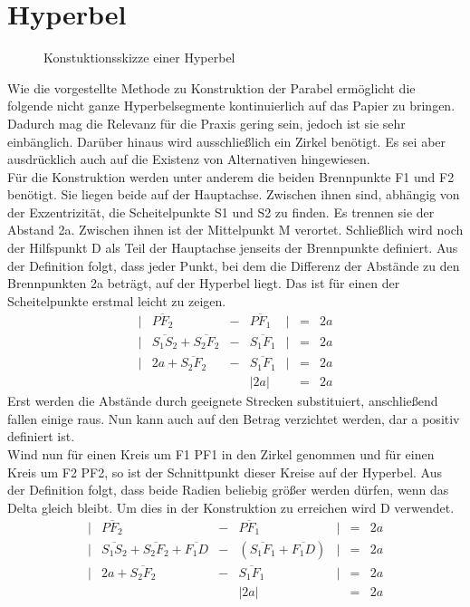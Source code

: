 \section{Hyperbel}
\begin{figure}[h]
	\centering
		\resizebox{.5\linewidth}{!}{
			
		}
	\caption{Konstuktionsskizze einer Hyperbel}
\end{figure}
Wie die vorgestellte Methode zu Konstruktion der Parabel ermöglicht die folgende nicht ganze Hyperbelsegmente kontinuierlich auf das Papier zu bringen. Dadurch mag die Relevanz für die Praxis gering sein, jedoch ist sie sehr einbänglich. Darüber hinaus wird ausschließlich ein Zirkel benötigt. Es sei aber ausdrücklich auch auf die Existenz von Alternativen hingewiesen.\\
Für die Konstruktion werden unter anderem die beiden Brennpunkte F1 und F2 benötigt. Sie liegen beide auf der Hauptachse. Zwischen ihnen sind, abhängig von der Exzentrizität, die Scheitelpunkte S1 und S2 zu finden. Es trennen sie der Abstand 2a. Zwischen ihnen ist der Mittelpunkt M verortet. Schließlich wird noch der Hilfspunkt D als Teil der Hauptachse jenseits der Brennpunkte definiert.
Aus der Definition folgt, dass jeder Punkt, bei dem die Differenz der Abstände zu den Brennpunkten 2a beträgt, auf der Hyperbel liegt. Das ist für einen der Scheitelpunkte erstmal leicht zu zeigen.
\begin{displaymath}
	\begin{array}{lcccrcl}
		|&\overline{{PF}_2} & - & \overline{{PF}_1}&| & = & 2a\\
		|&\overline{{S}_1{S}_2}+\overline{{S}_2{F}_2} & - & \overline{{S}_1{F}_1}&| & = & 2a\\
		|&2a+\overline{{S}_2{F}_2} & - & \overline{{S}_1{F}_1}&| & = & 2a\\
		&&&|2a| && = & 2a
	\end{array}
\end{displaymath}
Erst werden die Abstände durch geeignete Strecken substituiert, anschließend fallen einige raus. Nun kann auch auf den Betrag verzichtet werden, dar a positiv definiert ist.\\
Wind nun für einen Kreis um F1 PF1 in den Zirkel genommen und für einen Kreis um F2 PF2, so ist der Schnittpunkt dieser Kreise auf der Hyperbel. Aus der Definition folgt, dass beide Radien beliebig größer werden dürfen, wenn das Delta gleich bleibt. Um dies in der Konstruktion zu erreichen wird D verwendet.
\begin{displaymath}
	\begin{array}{lcccrcl}
		|&\overline{{PF}_2} & - & \overline{{PF}_1}&| & = & 2a\\
		|&\overline{{S}_1{S}_2}+\overline{{S}_2{F}_2}+\overline{{F}_1{D}} & - & (\overline{{S}_1{F}_1}+\overline{{F}_1{D}})&| & = & 2a\\
		|&2a+\overline{{S}_2{F}_2} & - & \overline{{S}_1{F}_1}&| & = & 2a\\
		&&&|2a| && = & 2a
	\end{array}
\end{displaymath}
